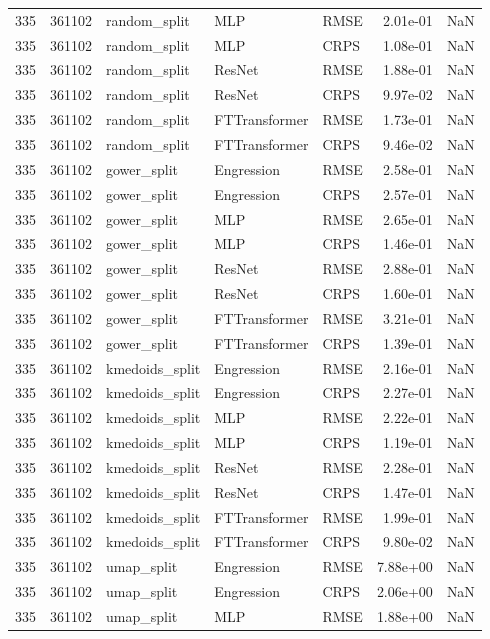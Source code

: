 \begin{tabular}{rrlllrr}
335 & 361102 & random\_split & MLP & RMSE & 2.01e-01 & NaN \\
335 & 361102 & random\_split & MLP & CRPS & 1.08e-01 & NaN \\
335 & 361102 & random\_split & ResNet & RMSE & 1.88e-01 & NaN \\
335 & 361102 & random\_split & ResNet & CRPS & 9.97e-02 & NaN \\
335 & 361102 & random\_split & FTTransformer & RMSE & 1.73e-01 & NaN \\
335 & 361102 & random\_split & FTTransformer & CRPS & 9.46e-02 & NaN \\
335 & 361102 & gower\_split & Engression & RMSE & 2.58e-01 & NaN \\
335 & 361102 & gower\_split & Engression & CRPS & 2.57e-01 & NaN \\
335 & 361102 & gower\_split & MLP & RMSE & 2.65e-01 & NaN \\
335 & 361102 & gower\_split & MLP & CRPS & 1.46e-01 & NaN \\
335 & 361102 & gower\_split & ResNet & RMSE & 2.88e-01 & NaN \\
335 & 361102 & gower\_split & ResNet & CRPS & 1.60e-01 & NaN \\
335 & 361102 & gower\_split & FTTransformer & RMSE & 3.21e-01 & NaN \\
335 & 361102 & gower\_split & FTTransformer & CRPS & 1.39e-01 & NaN \\
335 & 361102 & kmedoids\_split & Engression & RMSE & 2.16e-01 & NaN \\
335 & 361102 & kmedoids\_split & Engression & CRPS & 2.27e-01 & NaN \\
335 & 361102 & kmedoids\_split & MLP & RMSE & 2.22e-01 & NaN \\
335 & 361102 & kmedoids\_split & MLP & CRPS & 1.19e-01 & NaN \\
335 & 361102 & kmedoids\_split & ResNet & RMSE & 2.28e-01 & NaN \\
335 & 361102 & kmedoids\_split & ResNet & CRPS & 1.47e-01 & NaN \\
335 & 361102 & kmedoids\_split & FTTransformer & RMSE & 1.99e-01 & NaN \\
335 & 361102 & kmedoids\_split & FTTransformer & CRPS & 9.80e-02 & NaN \\
335 & 361102 & umap\_split & Engression & RMSE & 7.88e+00 & NaN \\
335 & 361102 & umap\_split & Engression & CRPS & 2.06e+00 & NaN \\
335 & 361102 & umap\_split & MLP & RMSE & 1.88e+00 & NaN \\

\end{tabular}
